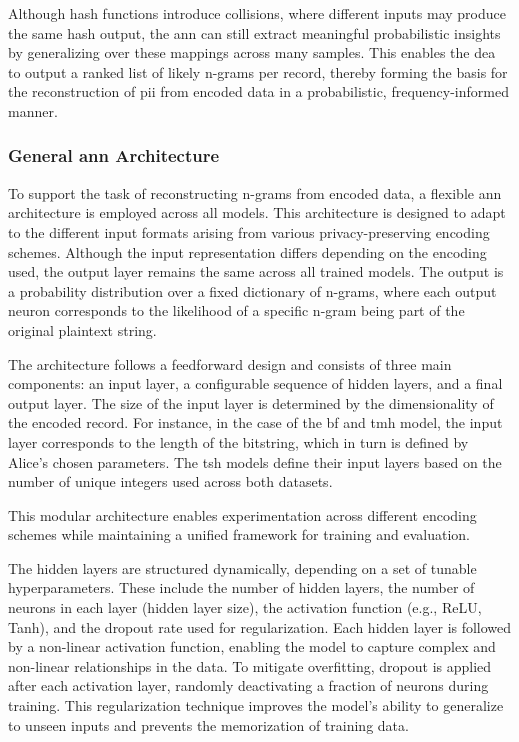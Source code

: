 Although hash functions introduce collisions, where different inputs may produce the same hash output, the \ac{ann} can still extract meaningful probabilistic insights by generalizing over these mappings across many samples.
This enables the \ac{dea} to output a ranked list of likely n-grams per record, thereby forming the basis for the reconstruction of \ac{pii} from encoded data in a probabilistic, frequency-informed manner.


\subsubsection{General \ac{ann} Architecture}

To support the task of reconstructing n-grams from encoded data, a flexible \ac{ann} architecture is employed across all models.
This architecture is designed to adapt to the different input formats arising from various privacy-preserving encoding schemes.
Although the input representation differs depending on the encoding used, the output layer remains the same across all trained models.
The output is a probability distribution over a fixed dictionary of n-grams, where each output neuron corresponds to the likelihood of a specific n-gram being part of the original plaintext string.

The architecture follows a feedforward design and consists of three main components: an input layer, a configurable sequence of hidden layers, and a final output layer.
The size of the input layer is determined by the dimensionality of the encoded record.
For instance, in the case of the \ac{bf} and \ac{tmh} model, the input layer corresponds to the length of the bitstring, which in turn is defined by Alice’s chosen parameters.
The \ac{tsh} models define their input layers based on the number of unique integers used across both datasets.

This modular architecture enables experimentation across different encoding schemes while maintaining a unified framework for training and evaluation.

The hidden layers are structured dynamically, depending on a set of tunable hyperparameters.
These include the number of hidden layers, the number of neurons in each layer (hidden layer size), the activation function (e.g., ReLU, Tanh), and the dropout rate used for regularization.
Each hidden layer is followed by a non-linear activation function, enabling the model to capture complex and non-linear relationships in the data.
To mitigate overfitting, dropout is applied after each activation layer, randomly deactivating a fraction of neurons during training.
This regularization technique improves the model's ability to generalize to unseen inputs and prevents the memorization of training data.

